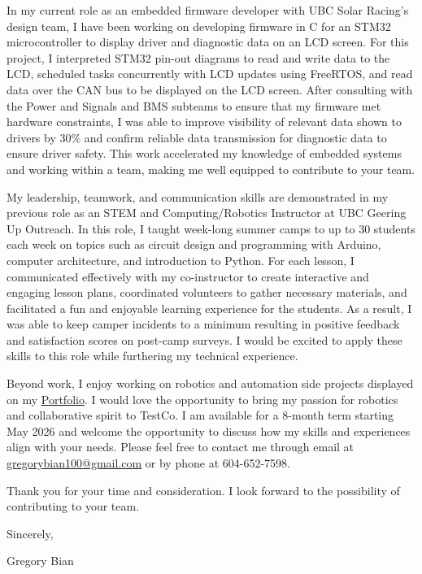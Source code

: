 \documentclass[letterpaper,11pt]{article}
\newcommand{\company}{TestCo}
\newcommand{\length}{8}
\begin{document}
In my current role as an embedded firmware developer with UBC Solar Racing's design team, I have been working on developing firmware in C for an STM32 microcontroller to display driver and diagnostic data on an LCD screen. For this project, I interpreted STM32 pin-out diagrams to read and write data to the LCD, scheduled tasks concurrently with LCD updates using FreeRTOS, and read data over the CAN bus to be displayed on the LCD screen. After consulting with the Power and Signals and BMS subteams to ensure that my firmware met hardware constraints, I was able to improve visibility of relevant data shown to drivers by 30\% and confirm reliable data transmission for diagnostic data to ensure driver safety. This work accelerated my knowledge of embedded systems and working within a team, making me well equipped to contribute to your team.

My leadership, teamwork, and communication skills are demonstrated in my previous role as an STEM and Computing/Robotics Instructor at UBC Geering Up Outreach. In this role, I taught week-long summer camps to up to 30 students each week on topics such as circuit design and programming with Arduino, computer architecture, and introduction to Python. For each lesson, I communicated effectively with my co-instructor to create interactive and engaging lesson plans, coordinated volunteers to gather necessary materials, and facilitated a fun and enjoyable learning experience for the students. As a result, I was able to keep camper incidents to a minimum resulting in positive feedback and satisfaction scores on post-camp surveys. I would be excited to apply these skills to this role while furthering my technical experience.

Beyond work, I enjoy working on robotics and automation side projects displayed on my \href{https://gregorybian.github.io}{\underline{Portfolio}}. I would love the opportunity to bring my passion for robotics and collaborative spirit to \company. I am available for a \length-month term starting May 2026 and welcome the opportunity to discuss how my skills and experiences align with your needs. Please feel free to contact me through email at \href{mailto:gregorybian100@gmail.com}{\underline{gregorybian100@gmail.com}} or by phone at 604-652-7598.

Thank you for your time and consideration. I look forward to the possibility of contributing to your team.
\bigskip %

Sincerely,
\bigskip %

Gregory Bian

\vspace{10pt}
\end{document}
